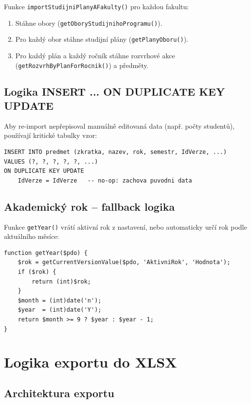 \documentclass[12pt,a4paper]{report}
\begin{document}
Funkce \texttt{importStudijniPlanyAFakulty()} pro každou fakultu:
\begin{enumerate}
  \item Stáhne obory (\texttt{getOboryStudijnihoProgramu()}).
  \item Pro každý obor stáhne studijní plány (\texttt{getPlanyOboru()}).
  \item Pro každý plán a každý ročník stáhne rozvrhové akce (\texttt{getRozvrhByPlanForRocnik()}) a předměty.
\end{enumerate}

\section{Logika INSERT ... ON DUPLICATE KEY UPDATE}

Aby re-import nepřepisoval manuálně editovaná data (např. počty studentů), používají kritické tabulky vzor:

\begin{lstlisting}[style=sqlstyle, caption={Zachování manuálních úprav při re-importu}]
INSERT INTO predmet (zkratka, nazev, rok, semestr, IdVerze, ...)
VALUES (?, ?, ?, ?, ?, ...)
ON DUPLICATE KEY UPDATE
    IdVerze = IdVerze   -- no-op: zachova puvodni data
\end{lstlisting}

\section{Akademický rok -- fallback logika}

Funkce \texttt{getYear()} vrátí aktivní rok z nastavení, nebo automaticky určí rok podle aktuálního měsíce:

\begin{lstlisting}[caption={Fallback určení akademického roku}]
function getYear($pdo) {
    $rok = getCurrentVersionValue($pdo, 'AktivniRok', 'Hodnota');
    if ($rok) {
        return (int)$rok;
    }
    $month = (int)date('n');
    $year  = (int)date('Y');
    return $month >= 9 ? $year : $year - 1;
}
\end{lstlisting}

\chapter{Logika exportu do XLSX}

\section{Architektura exportu}
\end{document}
